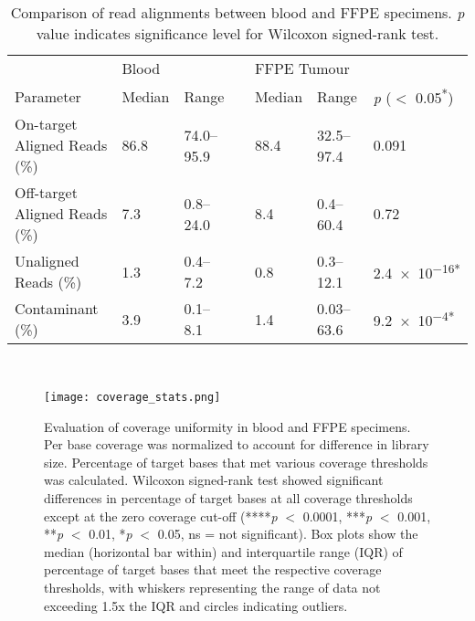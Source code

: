 \begin{table}[H]
\caption{Comparison of read alignments between blood and FFPE specimens. \textit{p} value indicates significance level for Wilcoxon signed-rank test.}
\label{tbl:alignment}
      \begin{tabular}{lllllll}
        \hline
				\multicolumn{1}{l}{ }
				&
				\multicolumn{2}{l}{Blood}
				&&
				\multicolumn{2}{l}{FFPE Tumour}
				&
				\multicolumn{1}{l}{ } \\
				\cline{2-3}\cline{5-6}
        Parameter & Median & Range && Median & Range & \textit{p} ($<$ 0.05\textsuperscript{*})
				\\
				\hline
				On-target Aligned Reads (\%) & 86.8 & 74.0--95.9 && 88.4 & 32.5--97.4 & \num{0.091}
				\\
				Off-target Aligned Reads (\%) & 7.3 & 0.8--24.0 && 8.4 & 0.4--60.4 & \num{0.72}
				\\
				Unaligned Reads (\%) & 1.3 & 0.4--7.2 && 0.8 & 0.3--12.1 & \num{2.4e-16}\textsuperscript{*}
				\\
				Contaminant (\%) & 3.9 & 0.1--8.1 && 1.4 & 0.03--63.6 &
				\num{9.2e-4}\textsuperscript{*}
				\\
				\hline
      \end{tabular} \\
\end{table}


\begin{figure}[H]
	\centering
	\texttt{[image: coverage\_stats.png]}
	\caption{Evaluation of coverage uniformity in blood and FFPE specimens. Per base coverage was normalized to account for difference in library size. Percentage of target bases that met various coverage thresholds was calculated. Wilcoxon signed-rank test showed significant differences in percentage of target bases at all coverage thresholds except at the zero coverage cut-off (****\textit{p} $<$ 0.0001, ***\textit{p} $<$ 0.001, **\textit{p} $<$ 0.01, *\textit{p} $<$ 0.05, ns = not significant). Box plots show the median (horizontal bar within) and interquartile range (IQR) of percentage of target bases that meet the respective coverage thresholds, with whiskers representing the range of data not exceeding 1.5x the IQR and circles indicating outliers.}
	\label{fig:coverage_stats}
\end{figure}

